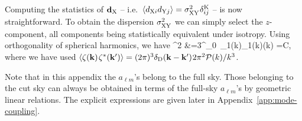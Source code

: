Computing the statistics of
$\mathbf{d}_{\mathrm{X}}$ -- i.e.~$\langle{d}_{\mrm{X}i}{d}_{\mrm{Y}j}\rangle=\sigma^2\Z{\mrm{XY}}\sp \delta_{ij}^\mrm{K}$ -- is now straightforward.
To obtain the dispersion $\sigma^2\Z{\mrm{XY}}$ we can
simply select the $z$-component, all components being statistically equivalent
under isotropy. Using orthogonality of spherical harmonics,
we have
\bea
    \sigma{}^2
        &=3\int^\infty_0\ \Delta_1(k)\ssp \Delta_1(k)\ssp \PR(k)
        =\ssp C,
    \label{eqn:sig-ab}
\eea
where we have used
$\langle{\zeta}(\mathbf{k})\hspace{0.09em}{\zeta}^*(\mathbf{k}')\rangle=(2\pi)^3\delta_{\rm D}(\mathbf{k}-\mathbf{k}')\hspace{0.06em} 2\pi^2\mathcal{P}(k)/k^3$.

Note that in this appendix the $a_{\ell m}$'s belong to the full sky.
Those belonging to the cut sky can always be obtained
in terms of the full-sky $a_{\ell m}$'s by geometric 
linear relations.
The explicit expressions are given later
in Appendix~\ref{app:mode-coupling}.


